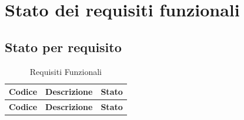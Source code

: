 \documentclass[a4paper,12pt]{article}
\begin{document}
    \section{Stato dei requisiti funzionali} {
        \subsection{Stato per requisito} {
            \begin{longtable}{|>{\centering\arraybackslash}m{}|>{\centering\arraybackslash}m{}|>{\centering\arraybackslash}m{}|}
                \caption{Requisiti Funzionali} \\
                
                \hline
                \rowcolor{lightgray}
                \textbf{Codice} & \textbf{Descrizione} & \textbf{Stato} \\
                \hline
                \endfirsthead
                
                \hline
                \rowcolor{lightgray}
                \textbf{Codice} & \textbf{Descrizione} & \textbf{Stato} \\
                \hline
                \endhead
                

\end{longtable}}}
\end{document}
